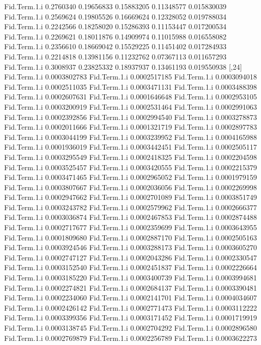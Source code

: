 \documentclass[11pt]{article} %
\begin{document}
\begin{Schunk}
\begin{Soutput}
Fid.Term.1.i 0.2760340 0.19656833 0.15883205 0.11348577 0.015830039
Fid.Term.1.i 0.2569624 0.19805526 0.16669624 0.12328052 0.019788034
Fid.Term.1.i 0.2242566 0.18258020 0.15286393 0.11153447 0.017200534
Fid.Term.1.i 0.2269621 0.18011876 0.14909974 0.11015988 0.016558082
Fid.Term.1.i 0.2356610 0.18669042 0.15529225 0.11451402 0.017284933
Fid.Term.1.i 0.2214818 0.13981156 0.11232762 0.07367113 0.011657293
Fid.Term.1.i 0.3008937 0.23825332 0.18937937 0.13461193 0.019550938
                    [,24]
Fid.Term.1.i 0.0003802783
Fid.Term.1.i 0.0002517185
Fid.Term.1.i 0.0003094018
Fid.Term.1.i 0.0002511035
Fid.Term.1.i 0.0003471131
Fid.Term.1.i 0.0003488398
Fid.Term.1.i 0.0002607631
Fid.Term.1.i 0.0001646648
Fid.Term.1.i 0.0002953105
Fid.Term.1.i 0.0003200919
Fid.Term.1.i 0.0002531464
Fid.Term.1.i 0.0002991063
Fid.Term.1.i 0.0002392856
Fid.Term.1.i 0.0002994540
Fid.Term.1.i 0.0003278873
Fid.Term.1.i 0.0002011666
Fid.Term.1.i 0.0001321719
Fid.Term.1.i 0.0002897783
Fid.Term.1.i 0.0003044199
Fid.Term.1.i 0.0003239952
Fid.Term.1.i 0.0004165988
Fid.Term.1.i 0.0001936019
Fid.Term.1.i 0.0003442451
Fid.Term.1.i 0.0002505117
Fid.Term.1.i 0.0003295549
Fid.Term.1.i 0.0002418325
Fid.Term.1.i 0.0002204598
Fid.Term.1.i 0.0003525457
Fid.Term.1.i 0.0003420555
Fid.Term.1.i 0.0002215379
Fid.Term.1.i 0.0003471465
Fid.Term.1.i 0.0002965052
Fid.Term.1.i 0.0001979159
Fid.Term.1.i 0.0003807667
Fid.Term.1.i 0.0002036056
Fid.Term.1.i 0.0002269998
Fid.Term.1.i 0.0002947662
Fid.Term.1.i 0.0002701089
Fid.Term.1.i 0.0003851749
Fid.Term.1.i 0.0003243782
Fid.Term.1.i 0.0002579962
Fid.Term.1.i 0.0002666377
Fid.Term.1.i 0.0003036874
Fid.Term.1.i 0.0002467853
Fid.Term.1.i 0.0002874488
Fid.Term.1.i 0.0002717677
Fid.Term.1.i 0.0002359699
Fid.Term.1.i 0.0003643955
Fid.Term.1.i 0.0001809680
Fid.Term.1.i 0.0002887170
Fid.Term.1.i 0.0002505163
Fid.Term.1.i 0.0003924546
Fid.Term.1.i 0.0003288173
Fid.Term.1.i 0.0003605270
Fid.Term.1.i 0.0002747127
Fid.Term.1.i 0.0002043286
Fid.Term.1.i 0.0002330547
Fid.Term.1.i 0.0003152540
Fid.Term.1.i 0.0002451837
Fid.Term.1.i 0.0002226664
Fid.Term.1.i 0.0003185220
Fid.Term.1.i 0.0003400739
Fid.Term.1.i 0.0003994681
Fid.Term.1.i 0.0002274821
Fid.Term.1.i 0.0002684137
Fid.Term.1.i 0.0003390481
Fid.Term.1.i 0.0002234060
Fid.Term.1.i 0.0002141701
Fid.Term.1.i 0.0004034607
Fid.Term.1.i 0.0002426142
Fid.Term.1.i 0.0002771473
Fid.Term.1.i 0.0003112222
Fid.Term.1.i 0.0003399356
Fid.Term.1.i 0.0003171452
Fid.Term.1.i 0.0001719919
Fid.Term.1.i 0.0003138745
Fid.Term.1.i 0.0002704292
Fid.Term.1.i 0.0002896580
Fid.Term.1.i 0.0002769879
Fid.Term.1.i 0.0002256789
Fid.Term.1.i 0.0003622273

\end{Soutput}
\end{Schunk}
\end{document}
